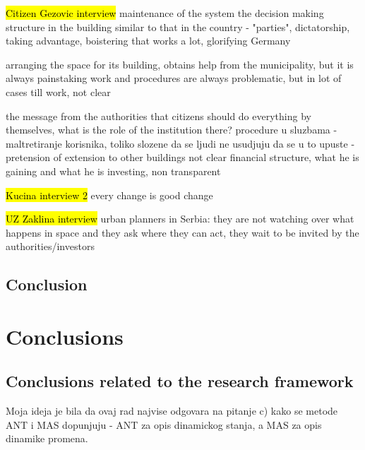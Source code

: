 \documentclass[11pt]{report}
\begin{document}
\hl{Citizen Gezovic interview}
maintenance of the system
the decision making structure in the building similar to that in the country - "parties", dictatorship, taking advantage, boistering that
 works a lot, glorifying Germany
 
 arranging the space for its building, obtains help from the municipality, but it is always painstaking work and procedures are always problematic, but in lot of cases till work, not clear
 
 the message from the authorities that citizens should do everything by themselves, what is the role of the institution there?
 procedure u sluzbama - maltretiranje korisnika, toliko slozene da se ljudi ne usudjuju da se u to upuste -
 pretension of extension to other buildings
 not clear financial structure, what he is gaining and what he is investing, non transparent
 
\hl{Kucina interview 2}
every change is good change

\hl{UZ Zaklina interview}
urban planners in Serbia: they are not watching over what happens in space and they ask where they can act, they wait to be invited by the authorities/investors

\section{Conclusion}



\chapter{Conclusions}


\section{Conclusions related to the research framework}

Moja ideja je bila da ovaj rad najvise odgovara na pitanje c) kako se metode ANT i MAS dopunjuju - ANT za opis dinamickog stanja, a MAS za opis dinamike promena.
\end{document}
